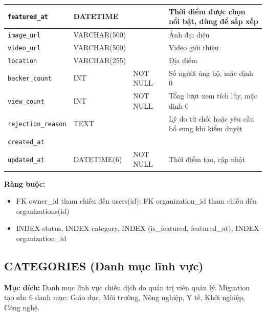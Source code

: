 {\begin{longtable}{|P{3.2cm}|P{2.8cm}|P{2.2cm}|p{5.4cm}|}
    \hline
    \texttt{featured\_\allowbreak{}at} & DATETIME &  & Thời điểm được chọn nổi bật, dùng để sắp xếp \\
    \hline
    \texttt{image\_\allowbreak{}url} & VARCHAR(500) &  & Ảnh đại diện \\
    \hline
    \texttt{video\_\allowbreak{}url} & VARCHAR(500) &  & Video giới thiệu \\
    \hline
    \texttt{location} & VARCHAR(255) &  & Địa điểm \\
    \hline
    \texttt{backer\_\allowbreak{}count} & INT & NOT NULL & Số người ủng hộ, mặc định 0 \\
    \hline
    \texttt{view\_\allowbreak{}count} & INT & NOT NULL & Tổng lượt xem tích lũy, mặc định 0 \\
    \hline
    \texttt{rejection\_\allowbreak{}reason} & TEXT &  & Lý do từ chối hoặc yêu cầu bổ sung khi kiểm duyệt \\
    \hline
    \texttt{created\_\allowbreak{}at} &  &  &  \\
    \hline
    \texttt{updated\_\allowbreak{}at} & DATETIME(6) & NOT NULL & Thời điểm tạo, cập nhật \\
    \hline
\end{longtable}
}

\textbf{Ràng buộc:}
\begin{itemize}
    \item FK owner\_\allowbreak{}id tham chiếu đến users(id); FK organization\_\allowbreak{}id tham chiếu đến organizations(id)
    \item INDEX status, INDEX category, INDEX (is\_\allowbreak{}featured, featured\_\allowbreak{}at), INDEX organization\_\allowbreak{}id
\end{itemize}

\subsection{CATEGORIES (Danh mục lĩnh vực)}

\textbf{Mục đích:} Danh mục lĩnh vực chiến dịch do quản trị viên quản lý. Migration tạo sẵn 6 danh mục: Giáo dục, Môi trường, Nông nghiệp, Y tế, Khởi nghiệp, Công nghệ.

